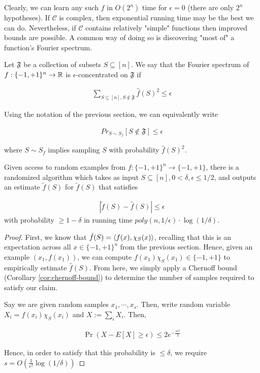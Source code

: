 \documentclass[main.tex]{subfiles}
\begin{document}
Clearly, we can learn any such $f$ in $O(2^n)$ time for $\epsilon = 0$ (there are only $2^n$ hypotheses). If $\mathcal{C}$ is complex, then exponential running time may be the best we can do. Nevertheless, if $\mathcal{C}$ contains relatively "simple" functions then improved bounds are possible. A common way of doing so is discovering "most of" a function's Fourier spectrum.

\begin{definition}
Let $\mathfrak{F}$ be a collection of subsets $S \subseteq [n]$. We say that the Fourier spectrum of $f: \{ -1, +1 \}^n \rightarrow \mathbb{R}$ is $\epsilon$-concentrated on $\mathfrak{F}$ if 

\begin{align*}
\sum_{S \subseteq [n], S \notin \mathfrak{F}} \hat{f}(S)^2 \leq \epsilon	
\end{align*}
	
Using the notation of the previous section, we can equivalently write

\begin{align*}
Pr_{S \sim S_f}[S \notin \mathfrak{F}] \leq \epsilon	
\end{align*}

where $S \sim S_f$ implies sampling $S$ with probability $\hat{f}(S)^2$. 
\end{definition}

\begin{proposition}
\label{prop:odon-330}
Given access to random examples from $f: \{ -1, +1\}^n \rightarrow \{-1, +1\}$, there is a randomized algorithm which takes as input $S \subseteq [n], 0 < \delta, \epsilon \leq 1/2$, and outputs an estimate $\tilde{f}(S)$ for $\tilde{f}(S)$ that satisfies

\begin{align*}
|\tilde{f}(S) - \hat{f}(S)| \leq \epsilon	
\end{align*}
with probability $\geq 1-\delta$ in running time $poly(n, 1/\epsilon) \cdot \log(1/ \delta)$.

\begin{proof}
	First, we know that $\hat{f}(S) = \langle f(x), \chi_S(x) \rangle$, recalling that this is an expectation across all $x \in \{-1, +1\}^n$ from the previous section. Hence, given an example $(x_1, f(x_1))$, we can compute $f(x_1)\chi_S(x_1) \in \{-1, +1\}$ to empirically estimate $\hat{f}(S)$. From here, we simply apply a Chernoff bound (Corollary \ref{cor:chernoff-bound}) to determine the number of samples required to satisfy our claim.
	
	Say we are given random samples $x_1, \cdots, x_s$. Then, write random variable $X_i = f(x_i)\chi_S(x_i)$ and $X := \sum_i X_i$. Then,
	
	\begin{align*}
	\Pr(X - E[X] \geq \epsilon) \leq 2e^{- \frac{s\epsilon^2}{2}}	
	\end{align*}
	
	Hence, in order to satisfy that this probability is $\leq \delta$, we require $s = O(\frac{1}{\epsilon^2} \log(1/\delta))$
\end{proof}
\end{proposition}
\end{document}
